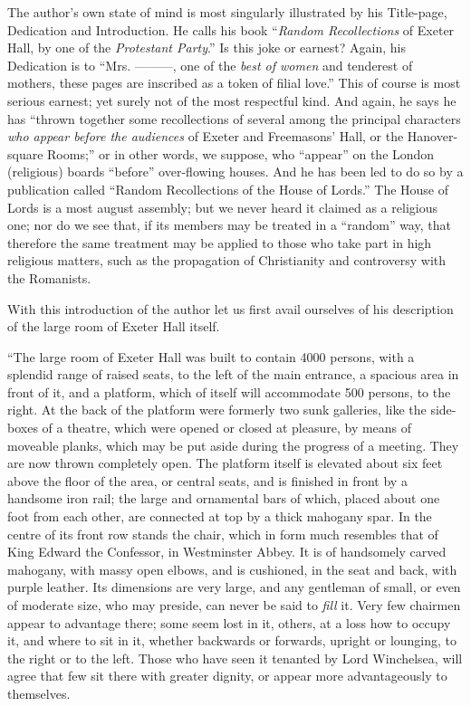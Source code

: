 The
author's own state of mind is most singularly illustrated by his
Title-page, Dedication and Introduction. He calls his book ``\emph{Random
Recollections} of Exeter Hall, by one of the \emph{Protestant Party}.''
Is this joke or earnest? Again, his Dedication is to ``Mrs. ———,
one of the \emph{best of women} and tenderest of mothers, these pages
are inscribed as a token of filial love.'' This of course is most
serious earnest; yet surely not of the most respectful kind. And again,
he says he has ``thrown together some recollections of several among
the principal characters \emph{who appear before the audiences} of
Exeter and Freemasons' Hall, or the Hanover-square Rooms;'' or in
other words, we suppose, who ``appear'' on the London (religious)
boards ``before'' over-flowing houses. And he has been led to do so by
a publication called ``Random Recollections of the House of Lords.''
The House of Lords is a most august assembly; but we never heard it
claimed as a religious one; nor do we see that, if its members may be
treated in a ``random'' way, that therefore the same treatment may be
applied to those who take part in high religious matters, such as the
propagation of Christianity and controversy with the Romanists.

With this
introduction of the author let us first avail ourselves of his
description of the large room of Exeter Hall itself.

``The
large room of Exeter Hall was built to contain 4000 persons, with a
splendid range of raised seats, to the left of the main entrance, a
spacious area in front of it, and a platform, which of itself will
accommodate 500 persons, to the right. At the back of the platform were
formerly two sunk galleries, like the side-boxes of a theatre, which
were opened or closed at pleasure, by means of moveable planks, which
may be put aside during the progress of a meeting. They are now thrown
completely open. The platform itself is elevated about six feet above
the floor of the area, or central seats, and is finished in front by a
handsome iron rail; the large and ornamental bars of which, placed about
one foot from each other, are connected at top by a thick mahogany
spar.
In the centre of its front row stands the chair, which in form much
resembles that of King Edward the Confessor, in Westminster Abbey. It is
of handsomely carved mahogany, with massy open elbows, and is cushioned,
in the seat and back, with purple leather. Its dimensions are very
large, and any gentleman of small, or even of moderate size, who may
preside, can never be said to \emph{fill} it. Very few chairmen appear
to advantage there; some seem lost in it, others, at a loss how to
occupy it, and where to sit in it, whether backwards or forwards,
upright or lounging, to the right or to the left. Those who have seen it
tenanted by Lord Winchelsea, will agree that few sit there with greater
dignity, or appear more advantageously to themselves.

